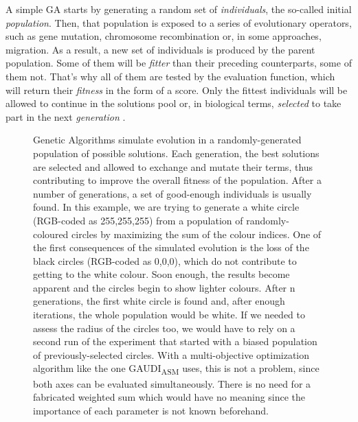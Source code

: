 A simple GA starts by generating a random set of \emph{individuals}, the so-called initial \emph{population}. Then, that population is exposed to a series of evolutionary operators, such as gene mutation, chromosome recombination or, in some approaches, migration. As a result, a new set of individuals is produced by the parent population. Some of them will be \emph{fitter} than their preceding counterparts, some of them not. That's why all of them are tested by the evaluation function, which will return their \emph{fitness} in the form of a score. Only the fittest individuals will be allowed to continue in the solutions pool or, in biological terms, \emph{selected} to take part in the next \emph{generation} .
\begin{figure}
\noindent{}
\caption[Simulating evolution with Genetic Algorithms]{Genetic Algorithms simulate evolution in a randomly-generated population of possible solutions.
Each generation, the best solutions are selected and allowed to exchange and mutate their terms, thus contributing to improve the overall fitness of the population. After a number of generations, a set of good-enough individuals is usually found. In this example, we are trying to generate a white circle (RGB-coded as 255,255,255) from a population of randomly-coloured circles by maximizing the sum of the colour indices. One of the first consequences of the simulated evolution is the loss of the black circles (RGB-coded as 0,0,0), which do not contribute to getting to the white colour. Soon enough, the results become apparent and the circles begin to show lighter colours. After n generations, the first white circle is found and, after enough iterations, the whole population would be white.
If we needed to assess the radius of the circles too, we would have to rely on a second run of the experiment that started with a biased population of previously-selected circles. With a multi-objective optimization algorithm like the one GAUDI\textsubscript{ASM} uses, this is not a problem, since both axes can be evaluated simultaneously. There is no need for a fabricated weighted sum which would have no meaning since the importance of each parameter is not known beforehand.}
\end{figure}

